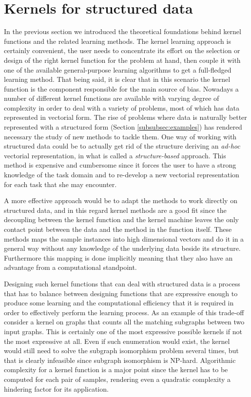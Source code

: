 
\section{Kernels for structured data}
\label{sec:graphkernels}

In the previous section we introduced the theoretical foundations behind kernel
functions and the related learning methods.
The kernel learning approach is certainly convenient, the user needs to concentrate
its effort on the selection or design of the right kernel function for the problem
at hand, then couple it with one of the available general-purpose learning algorithms to
get a full-fledged learning method.
That being said, it is clear that in this scenario the kernel function is the
component responsible for the main source of bias.
Nowadays a number of different kernel functions are available with varying degree
of complexity in order to deal with a variety of problems, most of which has data
represented in vectorial form.
The rise of problems where data is naturally better represented with a
structured form (Section \ref{subsubsec:examples}) has rendered necessary the
study of new methods to tackle them.
One way of working with structured data could be to actually get rid of the structure
deriving an \emph{ad-hoc} vectorial representation, in what is called a
\emph{structure-based} approach.
This method is expensive and cumbersome since it forces the user to have a strong
knowledge of the task domain and to re-develop a new vectorial representation
for each task that she may encounter.

A more effective approach would be to adapt the methods to work directly on
structured data, and in this regard kernel methods are a good fit since the
decoupling between the kernel function and the kernel machine leaves the
only contact point between the data and the method in the function itself.
These methods maps the sample instances into high dimensional vectors and do it
in a general way without any knowledge of the underlying data beside its structure.
Furthermore this mapping is done implicitly meaning that they also have an
advantage from a computational standpoint.

Designing such kernel functions that can deal with structured data is a process
that has to balance between designing functions that are expressive enough to
produce some learning and the computational efficiency that it is required in
order to effectively perform the learning process.
As an example of this trade-off consider a kernel on graphs that counts all the
matching subgraphs between two input graphs.
This is certainly one of the most expressive possible kernels if not the most expressive
at all.
Even if such enumeration would exist, the kernel would still need to solve the
subgraph isomorphism problem several times, but that is clearly infeasible since subgraph
isomorphism is NP-hard.
Algorithmic complexity for a kernel function is a major point since the kernel has
to be computed for each pair of samples, rendering even a quadratic complexity
a hindering factor for its application.

